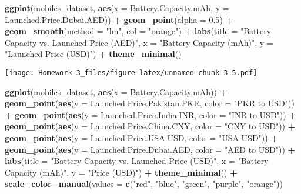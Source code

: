 \documentclass[
]{article}
\newenvironment{Shaded}{\begin{snugshade}}{\end{snugshade}}
\newcommand{\AttributeTok}[1]{\textcolor[rgb]{0.13,0.29,0.53}{#1}}
\newcommand{\FloatTok}[1]{\textcolor[rgb]{0.00,0.00,0.81}{#1}}
\newcommand{\FunctionTok}[1]{\textcolor[rgb]{0.13,0.29,0.53}{\textbf{#1}}}
\newcommand{\NormalTok}[1]{#1}
\newcommand{\SpecialCharTok}[1]{\textcolor[rgb]{0.81,0.36,0.00}{\textbf{#1}}}
\newcommand{\StringTok}[1]{\textcolor[rgb]{0.31,0.60,0.02}{#1}}
\begin{document}
\begin{Shaded}
\begin{Highlighting}[]
\FunctionTok{ggplot}\NormalTok{(mobiles\_dataset, }\FunctionTok{aes}\NormalTok{(}\AttributeTok{x =}\NormalTok{ Battery.Capacity.mAh, }\AttributeTok{y =}\NormalTok{ Launched.Price.Dubai.AED)) }\SpecialCharTok{+}
  \FunctionTok{geom\_point}\NormalTok{(}\AttributeTok{alpha =} \FloatTok{0.5}\NormalTok{) }\SpecialCharTok{+}
  \FunctionTok{geom\_smooth}\NormalTok{(}\AttributeTok{method =} \StringTok{"lm"}\NormalTok{, }\AttributeTok{col =} \StringTok{"orange"}\NormalTok{) }\SpecialCharTok{+}
  \FunctionTok{labs}\NormalTok{(}\AttributeTok{title =} \StringTok{"Battery Capacity vs. Launched Price (AED)"}\NormalTok{,}
       \AttributeTok{x =} \StringTok{"Battery Capacity (mAh)"}\NormalTok{,}
       \AttributeTok{y =} \StringTok{"Launched Price (USD)"}\NormalTok{) }\SpecialCharTok{+}
  \FunctionTok{theme\_minimal}\NormalTok{()}
\end{Highlighting}
\end{Shaded}

\texttt{[image: Homework-3\_files/figure-latex/unnamed-chunk-3-5.pdf]}

\begin{Shaded}
\begin{Highlighting}[]
\FunctionTok{ggplot}\NormalTok{(mobiles\_dataset, }\FunctionTok{aes}\NormalTok{(}\AttributeTok{x =}\NormalTok{ Battery.Capacity.mAh)) }\SpecialCharTok{+}
  \FunctionTok{geom\_point}\NormalTok{(}\FunctionTok{aes}\NormalTok{(}\AttributeTok{y =}\NormalTok{ Launched.Price.Pakistan.PKR, }\AttributeTok{color =} \StringTok{"PKR to USD"}\NormalTok{)) }\SpecialCharTok{+}
  \FunctionTok{geom\_point}\NormalTok{(}\FunctionTok{aes}\NormalTok{(}\AttributeTok{y =}\NormalTok{ Launched.Price.India.INR, }\AttributeTok{color =} \StringTok{"INR to USD"}\NormalTok{)) }\SpecialCharTok{+}
  \FunctionTok{geom\_point}\NormalTok{(}\FunctionTok{aes}\NormalTok{(}\AttributeTok{y =}\NormalTok{ Launched.Price.China.CNY, }\AttributeTok{color =} \StringTok{"CNY to USD"}\NormalTok{)) }\SpecialCharTok{+}
  \FunctionTok{geom\_point}\NormalTok{(}\FunctionTok{aes}\NormalTok{(}\AttributeTok{y =}\NormalTok{ Launched.Price.USA.USD, }\AttributeTok{color =} \StringTok{"USA USD"}\NormalTok{)) }\SpecialCharTok{+}
  \FunctionTok{geom\_point}\NormalTok{(}\FunctionTok{aes}\NormalTok{(}\AttributeTok{y =}\NormalTok{ Launched.Price.Dubai.AED, }\AttributeTok{color =} \StringTok{"AED to USD"}\NormalTok{)) }\SpecialCharTok{+}
  \FunctionTok{labs}\NormalTok{(}\AttributeTok{title =} \StringTok{"Battery Capacity vs. Launched Price (USD)"}\NormalTok{, }\AttributeTok{x =} \StringTok{"Battery Capacity (mAh)"}\NormalTok{, }\AttributeTok{y =} \StringTok{"Price (USD)"}\NormalTok{) }\SpecialCharTok{+}
  \FunctionTok{theme\_minimal}\NormalTok{() }\SpecialCharTok{+}
  \FunctionTok{scale\_color\_manual}\NormalTok{(}\AttributeTok{values =} \FunctionTok{c}\NormalTok{(}\StringTok{"red"}\NormalTok{, }\StringTok{"blue"}\NormalTok{, }\StringTok{"green"}\NormalTok{, }\StringTok{"purple"}\NormalTok{, }\StringTok{"orange"}\NormalTok{))}
\end{Highlighting}
\end{Shaded}
\end{document}

